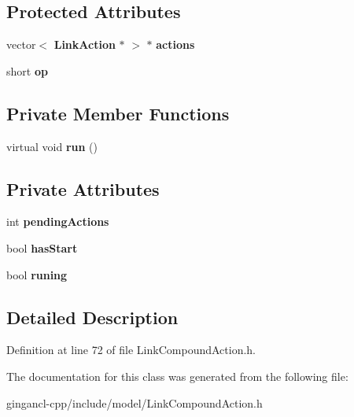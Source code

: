 \subsection*{Protected Attributes}
\begin{CompactItemize}
\item 
vector$<$ {\bf LinkAction} $\ast$ $>$ $\ast$ {\bf actions}\label{classbr_1_1pucrio_1_1telemidia_1_1ginga_1_1ncl_1_1model_1_1link_1_1LinkCompoundAction_2720bd13554491c68e3d514f86d3d6cb}

\item 
short {\bf op}\label{classbr_1_1pucrio_1_1telemidia_1_1ginga_1_1ncl_1_1model_1_1link_1_1LinkCompoundAction_d974463b4b2532a79f54eb0ade5c0c2d}

\end{CompactItemize}
\subsection*{Private Member Functions}
\begin{CompactItemize}
\item 
virtual void \textbf{run} ()\label{classbr_1_1pucrio_1_1telemidia_1_1ginga_1_1ncl_1_1model_1_1link_1_1LinkCompoundAction_72fcb26a14f6beb1c3fbace9ab3e7dbb}

\end{CompactItemize}
\subsection*{Private Attributes}
\begin{CompactItemize}
\item 
int {\bf pendingActions}\label{classbr_1_1pucrio_1_1telemidia_1_1ginga_1_1ncl_1_1model_1_1link_1_1LinkCompoundAction_9b53f7d80c64653007a633b59c789c97}

\item 
bool {\bf hasStart}\label{classbr_1_1pucrio_1_1telemidia_1_1ginga_1_1ncl_1_1model_1_1link_1_1LinkCompoundAction_44e48e2dbd933863a3fb5a25d46a2e53}

\item 
bool {\bf runing}\label{classbr_1_1pucrio_1_1telemidia_1_1ginga_1_1ncl_1_1model_1_1link_1_1LinkCompoundAction_961a80764438100fd2d7741446831a63}

\end{CompactItemize}


\subsection{Detailed Description}




Definition at line 72 of file LinkCompoundAction.h.

The documentation for this class was generated from the following file:\begin{CompactItemize}
\item 
gingancl-cpp/include/model/LinkCompoundAction.h\end{CompactItemize}

